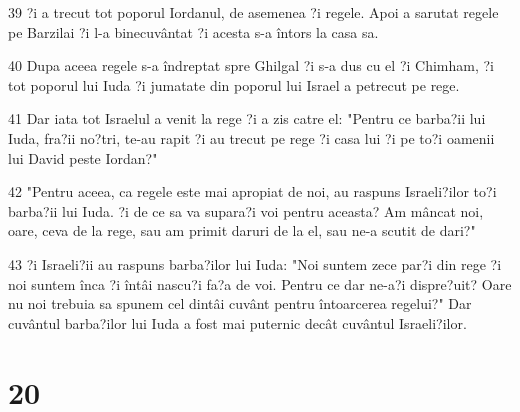 \par 39 ?i a trecut tot poporul Iordanul, de asemenea ?i regele. Apoi a sarutat regele pe Barzilai ?i l-a binecuvântat ?i acesta s-a întors la casa sa.
\par 40 Dupa aceea regele s-a îndreptat spre Ghilgal ?i s-a dus cu el ?i Chimham, ?i tot poporul lui Iuda ?i jumatate din poporul lui Israel a petrecut pe rege.
\par 41 Dar iata tot Israelul a venit la rege ?i a zis catre el: "Pentru ce barba?ii lui Iuda, fra?ii no?tri, te-au rapit ?i au trecut pe rege ?i casa lui ?i pe to?i oamenii lui David peste Iordan?"
\par 42 "Pentru aceea, ca regele este mai apropiat de noi, au raspuns Israeli?ilor to?i barba?ii lui Iuda. ?i de ce sa va supara?i voi pentru aceasta? Am mâncat noi, oare, ceva de la rege, sau am primit daruri de la el, sau ne-a scutit de dari?"
\par 43 ?i Israeli?ii au raspuns barba?ilor lui Iuda: "Noi suntem zece par?i din rege ?i noi suntem înca ?i întâi nascu?i fa?a de voi. Pentru ce dar ne-a?i dispre?uit? Oare nu noi trebuia sa spunem cel dintâi cuvânt pentru întoarcerea regelui?" Dar cuvântul barba?ilor lui Iuda a fost mai puternic decât cuvântul Israeli?ilor.

\chapter{20}

